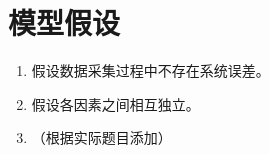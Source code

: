 
\section{模型假设}


\begin{enumerate}
  \item 假设数据采集过程中不存在系统误差。
  \item 假设各因素之间相互独立。
  \item （根据实际题目添加）
\end{enumerate}
